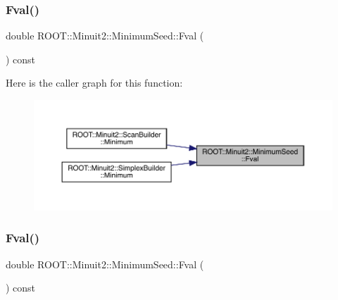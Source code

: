 \mbox{\label{classROOT_1_1Minuit2_1_1MinimumSeed_a55c498b499c84f1a693729aa269db9aa}} 
\subsubsection{\texorpdfstring{Fval()}{Fval()}\hspace{0.1cm}{\footnotesize\ttfamily [1/2]}}
{\footnotesize\ttfamily double R\+O\+O\+T\+::\+Minuit2\+::\+Minimum\+Seed\+::\+Fval (\begin{DoxyParamCaption}{ }\end{DoxyParamCaption}) const\hspace{0.3cm}{\ttfamily [inline]}}

Here is the caller graph for this function\+:\nopagebreak
\begin{figure}[H]
\begin{center}
\leavevmode
\includegraphics[width=350pt]{d1/d50/classROOT_1_1Minuit2_1_1MinimumSeed_a55c498b499c84f1a693729aa269db9aa_icgraph}
\end{center}
\end{figure}
\mbox{\label{classROOT_1_1Minuit2_1_1MinimumSeed_a55c498b499c84f1a693729aa269db9aa}} 
\subsubsection{\texorpdfstring{Fval()}{Fval()}\hspace{0.1cm}{\footnotesize\ttfamily [2/2]}}
{\footnotesize\ttfamily double R\+O\+O\+T\+::\+Minuit2\+::\+Minimum\+Seed\+::\+Fval (\begin{DoxyParamCaption}{ }\end{DoxyParamCaption}) const\hspace{0.3cm}{\ttfamily [inline]}}

